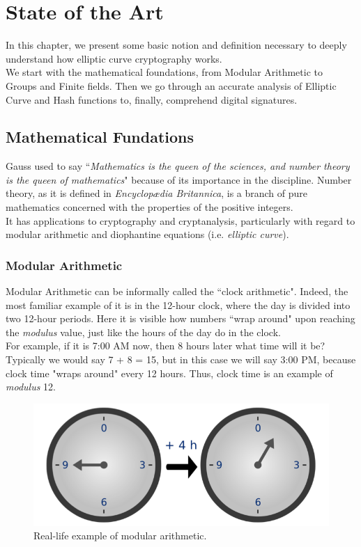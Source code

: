 \chapter{State of the Art}
\label{capitolo2}


In this chapter, we present some basic notion and definition necessary to deeply understand how elliptic curve cryptography works.\\
We start with the mathematical foundations, from Modular Arithmetic to Groups and Finite fields. Then we go through an accurate analysis of Elliptic Curve and Hash functions to, finally, comprehend digital signatures.

\section{Mathematical Fundations}
Gauss used to say ``\textit{Mathematics is the queen of the sciences, and number theory is the queen of mathematics}" because of its importance in the discipline. Number theory, as it is defined in \textit{Encyclop\ae dia Britannica\cite{EnBrit}}, is a branch of pure mathematics concerned with the properties of the positive integers. \\
It has applications to cryptography and cryptanalysis, particularly with regard to modular arithmetic and diophantine equations (i.e. \textit{elliptic curve}).
\subsection{Modular Arithmetic}
Modular Arithmetic can be informally called the ``clock arithmetic". Indeed, the most familiar example of it is in the 12-hour clock, where the day is divided into two 12-hour periods. Here it is visible how numbers ``wrap around" upon reaching the \textit{modulus} value, just like the hours of the day do in the clock.\\
For example, if it is 7:00 AM now, then 8 hours later what time will it be? Typically we would say 7 + 8 = 15, but in this case we will say 3:00 PM, because clock time "wraps around" every 12 hours. Thus, clock time is an example of \textit{modulus} 12.
\begin{figure}[H]
	\centering
	\includegraphics[width=.75\textwidth]{clock.png}
	\caption{Real-life example of modular arithmetic\cite{wiki}.}
	\label{img:clock}
\end{figure}

